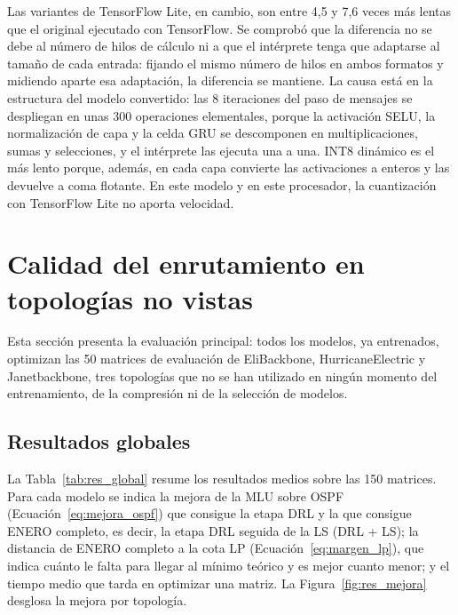 Las variantes de TensorFlow Lite, en cambio, son entre 4,5 y 7,6 veces más lentas que el original ejecutado con TensorFlow. Se comprobó que la diferencia no se debe al número de hilos de cálculo ni a que el intérprete tenga que adaptarse al tamaño de cada entrada: fijando el mismo número de hilos en ambos formatos y midiendo aparte esa adaptación, la diferencia se mantiene. La causa está en la estructura del modelo convertido: las 8 iteraciones del paso de mensajes se despliegan en unas 300 operaciones elementales, porque la activación SELU, la normalización de capa y la celda GRU se descomponen en multiplicaciones, sumas y selecciones, y el intérprete las ejecuta una a una. INT8 dinámico es el más lento porque, además, en cada capa convierte las activaciones a enteros y las devuelve a coma flotante. En este modelo y en este procesador, la cuantización con TensorFlow Lite no aporta velocidad.

\section{Calidad del enrutamiento en topologías no vistas}\label{sec:res_calidad}

Esta sección presenta la evaluación principal: todos los modelos, ya entrenados, optimizan las 50 matrices de evaluación de EliBackbone, HurricaneElectric y Janetbackbone, tres topologías que no se han utilizado en ningún momento del entrenamiento, de la compresión ni de la selección de modelos.

\subsection{Resultados globales}

La Tabla~\ref{tab:res_global} resume los resultados medios sobre las 150 matrices. Para cada modelo se indica la mejora de la MLU sobre OSPF (Ecuación~\eqref{eq:mejora_ospf}) que consigue la etapa DRL y la que consigue ENERO completo, es decir, la etapa DRL seguida de la LS (DRL + LS); la distancia de ENERO completo a la cota LP (Ecuación~\eqref{eq:margen_lp}), que indica cuánto le falta para llegar al mínimo teórico y es mejor cuanto menor; y el tiempo medio que tarda en optimizar una matriz. La Figura~\ref{fig:res_mejora} desglosa la mejora por topología.

